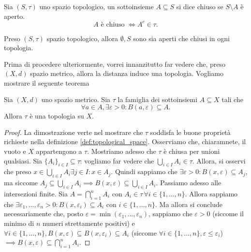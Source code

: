 \begin{definition}
    Sia $(S, \tau)$ uno spazio topologico, un sottoinsieme $A \subseteq S$ si dice chiuso se $S \setminus A$ è aperto.
    \begin{equation*}
        A \text{ è chiuso } \iff A^c \in \tau.
    \end{equation*}
\end{definition}
\begin{remark}
    Preso $(S, \tau)$ spazio topologico, allora $\emptyset, S$ sono sia aperti che chiusi in ogni topologia.
\end{remark}
Prima di procedere ulteriormente, vorrei innanzitutto far vedere che, preso $(X, d)$ spazio metrico, allora la distanza induce una topologia. Vogliamo mostrare il seguente teorema
\begin{theorem}
    Sia $(X, d)$ uno spazio metrico. Sia $\tau$ la famiglia dei sottoinsiemi $A \subseteq X$ tali che
    $$
    \forall a \in A, \exists \varepsilon > 0 : B(a, \varepsilon) \subseteq A.
    $$
    Allora $\tau$ è una topologia su $X$.
\end{theorem}
\begin{proof}
    La dimostrazione verte nel mostrare che $\tau$ soddisfa le buone proprietà richieste nella definizione \ref{def:topological_space}. Osserviamo che, chiaramnete, il vuoto e $X$ appartengono a $\tau$. Mostriamo
    adesso che $\tau$ è chiusa per unioni qualsiasi. Sia $\{ A_i \}_{i \in I} \subseteq \tau$: vogliamo far vedere che $\bigcup\limits_{i \in I} A_i \in \tau$. Allora, si osservi che preso $x \in \bigcup\limits_{i \in I} A_i \exists j \in I : x \in A_j$. Quindi sappiamo
    che $\exists \varepsilon > 0 : B(x, \varepsilon) \subseteq A_j$, ma siccome $A_j \subseteq \bigcup\limits_{i \in I} A_i \implies B(x, \varepsilon) \subseteq \bigcup\limits_{i \in I} A_i$.
    Passiamo adesso alle intersezioni finite. Sia $A = \bigcap\limits_{i=1}^n A_i$ con $A_i \in \tau \, \forall i \in \{ 1, \ldots, n\}$. Allora sappiamo che $\exists \varepsilon_1, \ldots, \varepsilon_n > 0: B(x, \varepsilon_i) \subseteq A_i$ con $i \in \{1, \ldots, n \}$. Ma allora si conclude necessariamente
    che, posto $\varepsilon = \min(\varepsilon_1, \ldots, \varepsilon_n)$, sappiamo che $\varepsilon > 0$ (siccome il minimo di $n$ numeri strettamente positivi) e $\forall i \in \{1, \ldots, n \}, B(x, \varepsilon) \subseteq B(x, \varepsilon_i) \subseteq A_i$ (siccome $\forall i \in \{1, \ldots, n \}, \varepsilon \leq \varepsilon_i$) $\implies B(x, \varepsilon) \subseteq \bigcap\limits_{i=1}^n A_i$.
\end{proof}


